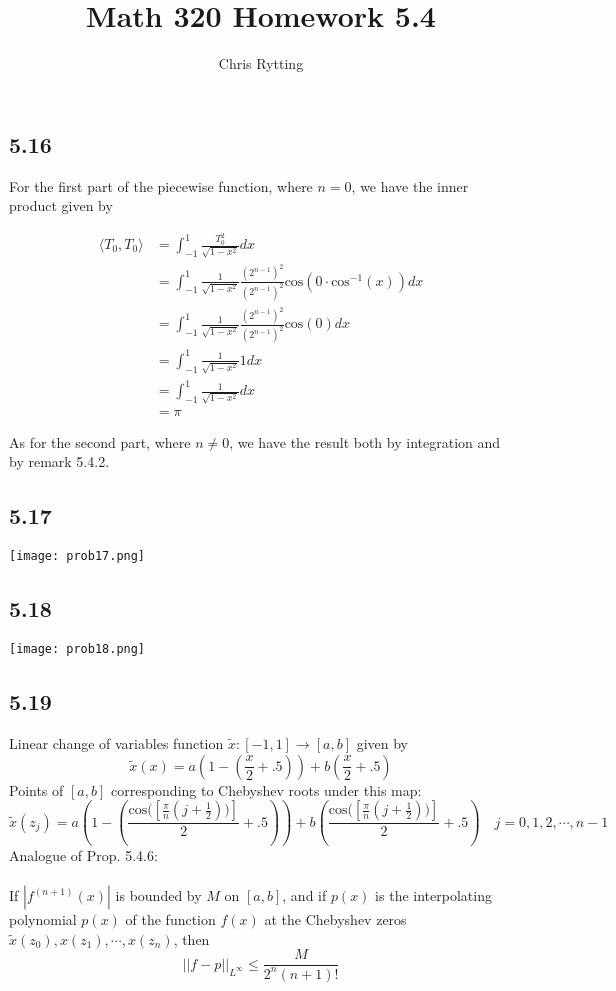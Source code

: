 \documentclass[letterpaper,12pt]{article}
\theoremstyle{definition}
\begin{document}
\title{Math 320 Homework 5.4}
\author{Chris Rytting}
\maketitle
\subsection*{5.16}
For the first part of the piecewise function, where $n = 0$, we have the inner product given by

\begin{align*}
\langle T_0,T_0 \rangle &= \int^{1}_{-1} \frac{T_0^2}{\sqrt{1- x^2}} dx 
\\&= \int^{1}_{-1}\frac{1}{\sqrt{1- x^2}}\frac{(2^{n-1})^2}{(2^{n-1})^2} \text{cos}(0 \cdot \text{cos}^{-1}(x))dx
\\&= \int^{1}_{-1}\frac{1}{\sqrt{1- x^2}}\frac{(2^{n-1})^2}{(2^{n-1})^2} \text{cos}(0)dx
\\&= \int^{1}_{-1}\frac{1}{\sqrt{1- x^2}} 1dx
\\&= \int^{1}_{-1}\frac{1}{\sqrt{1- x^2}} dx
\\&= \pi
\end{align*}

As for the second part, where $n \neq 0$, we have the result both by integration and by remark 5.4.2.
\subsection*{5.17}

\texttt{[image: prob17.png]}


\subsection*{5.18}

\texttt{[image: prob18.png]}

\subsection*{5.19}
Linear change of variables function $\tilde x: [-1,1] \to [a,b] $ given by 
\[\tilde x(x) = a\left(1 - \left( \frac{x}{2} + .5\right) \right) + b\left( \frac{x}{2} + .5 \right)\]
Points of $[a,b]$ corresponding to Chebyshev roots under this map:
\[\tilde x (z_j) = a\left(1 - \left( \frac{\text{cos}(\left[\frac{\pi}{n} \left( j + \frac{1}{2} \right))\right]}{2} + .5\right) \right) + b\left( \frac{\text{cos}(\left[\frac{\pi}{n} \left( j + \frac{1}{2} \right))\right]}{2} + .5 \right) \quad j = 0,1,2,\cdots,n-1\] 
Analogue of Prop. 5.4.6:\\\\
If $|f^{(n+1)}(x)|$ is bounded by $M$ on $[a,b]$, and if $p(x)$ is the interpolating polynomial $p(x)$ of the function $f(x)$ at the Chebyshev zeros $\tilde x(z_0),x(z_1),\cdots,x(z_n)$, then 
\[ ||f - p||_{L^\infty} \leq \frac{M}{2^n(n+1)!}\]
\end{document}
